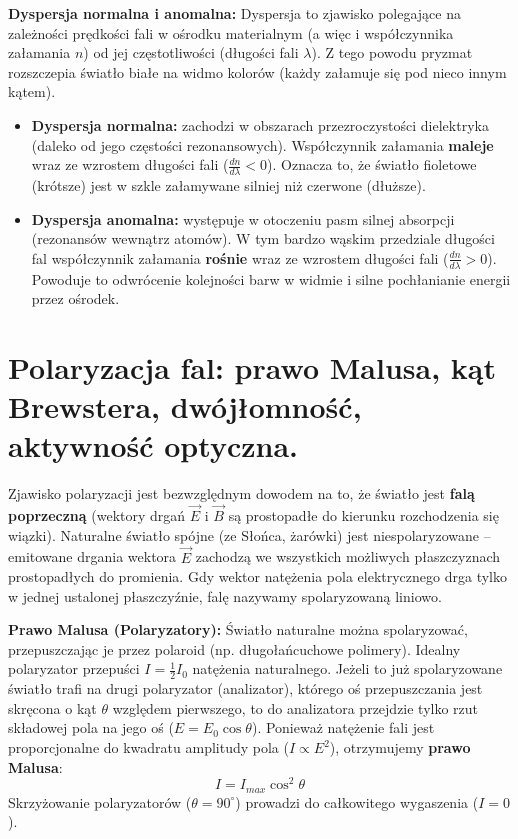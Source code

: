 \documentclass[11pt, a4paper]{article}
\begin{document}
\textbf{Dyspersja normalna i anomalna:}
Dyspersja to zjawisko polegające na zależności prędkości fali w ośrodku materialnym (a więc i współczynnika załamania $n$) od jej częstotliwości (długości fali $\lambda$). Z tego powodu pryzmat rozszczepia światło białe na widmo kolorów (każdy załamuje się pod nieco innym kątem).
\begin{itemize}
    \item \textbf{Dyspersja normalna:} zachodzi w obszarach przezroczystości dielektryka (daleko od jego częstości rezonansowych). Współczynnik załamania \textbf{maleje} wraz ze wzrostem długości fali ($\frac{dn}{d\lambda} < 0$). Oznacza to, że światło fioletowe (krótsze) jest w szkle załamywane silniej niż czerwone (dłuższe).
    \item \textbf{Dyspersja anomalna:} występuje w otoczeniu pasm silnej absorpcji (rezonansów wewnątrz atomów). W tym bardzo wąskim przedziale długości fal współczynnik załamania \textbf{rośnie} wraz ze wzrostem długości fali ($\frac{dn}{d\lambda} > 0$). Powoduje to odwrócenie kolejności barw w widmie i silne pochłanianie energii przez ośrodek.
\end{itemize}

\section{Polaryzacja fal: prawo Malusa, kąt Brewstera, dwójłomność, aktywność optyczna.}

Zjawisko polaryzacji jest bezwzględnym dowodem na to, że światło jest \textbf{falą poprzeczną} (wektory drgań $\vec{E}$ i $\vec{B}$ są prostopadłe do kierunku rozchodzenia się wiązki). Naturalne światło spójne (ze Słońca, żarówki) jest niespolaryzowane – emitowane drgania wektora $\vec{E}$ zachodzą we wszystkich możliwych płaszczyznach prostopadłych do promienia. Gdy wektor natężenia pola elektrycznego drga tylko w jednej ustalonej płaszczyźnie, falę nazywamy spolaryzowaną liniowo.

\textbf{Prawo Malusa (Polaryzatory):}
Światło naturalne można spolaryzować, przepuszczając je przez polaroid (np. długołańcuchowe polimery). Idealny polaryzator przepuści $I = \frac{1}{2}I_0$ natężenia naturalnego. Jeżeli to już spolaryzowane światło trafi na drugi polaryzator (analizator), którego oś przepuszczania jest skręcona o kąt $\theta$ względem pierwszego, to do analizatora przejdzie tylko rzut składowej pola na jego oś ($E = E_0 \cos\theta$). Ponieważ natężenie fali jest proporcjonalne do kwadratu amplitudy pola ($I \propto E^2$), otrzymujemy \textbf{prawo Malusa}:
\[
I = I_{max} \cos^2\theta
\]
Skrzyżowanie polaryzatorów ($\theta = 90^\circ$) prowadzi do całkowitego wygaszenia ($I = 0$).
\end{document}
